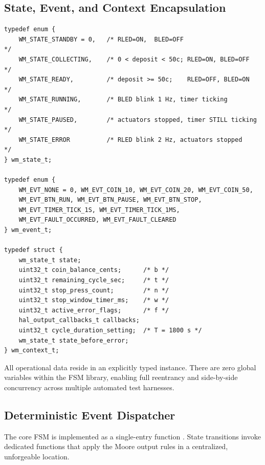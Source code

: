 \subsection{State, Event, and Context Encapsulation}

\begin{lstlisting}[caption={State, event, and context data structure definitions}]
typedef enum {
    WM_STATE_STANDBY = 0,   /* RLED=ON,  BLED=OFF                     */
    WM_STATE_COLLECTING,    /* 0 < deposit < 50c; RLED=ON, BLED=OFF   */
    WM_STATE_READY,         /* deposit >= 50c;    RLED=OFF, BLED=ON   */
    WM_STATE_RUNNING,       /* BLED blink 1 Hz, timer ticking         */
    WM_STATE_PAUSED,        /* actuators stopped, timer STILL ticking */
    WM_STATE_ERROR          /* RLED blink 2 Hz, actuators stopped     */
} wm_state_t;

typedef enum {
    WM_EVT_NONE = 0, WM_EVT_COIN_10, WM_EVT_COIN_20, WM_EVT_COIN_50,
    WM_EVT_BTN_RUN, WM_EVT_BTN_PAUSE, WM_EVT_BTN_STOP,
    WM_EVT_TIMER_TICK_1S, WM_EVT_TIMER_TICK_1MS,
    WM_EVT_FAULT_OCCURRED, WM_EVT_FAULT_CLEARED
} wm_event_t;

typedef struct {
    wm_state_t state;
    uint32_t coin_balance_cents;      /* b */
    uint32_t remaining_cycle_sec;     /* t */
    uint32_t stop_press_count;        /* n */
    uint32_t stop_window_timer_ms;    /* w */
    uint32_t active_error_flags;      /* f */
    hal_output_callbacks_t callbacks;
    uint32_t cycle_duration_setting;  /* T = 1800 s */
    wm_state_t state_before_error;
} wm_context_t;
\end{lstlisting}

\noindent All operational data reside in an explicitly typed  instance.
There are zero global variables within the FSM library, enabling full reentrancy and side-by-side
concurrency across multiple automated test harnesses.

\subsection{Deterministic Event Dispatcher}

The core FSM is implemented as a single-entry function .
State transitions invoke dedicated  functions that apply the Moore output
rules in a centralized, unforgeable location.

